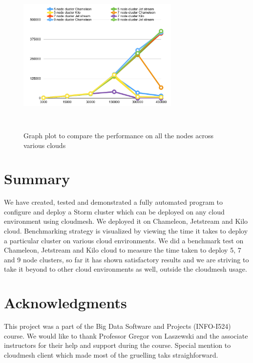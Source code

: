 \documentclass[9pt,twocolumn,twoside]{../../styles/osajnl}
\begin{document}
\begin{figure}[!htb]
  \includegraphics[width=8cm,height=8cm,keepaspectratio,width=\linewidth]{images/bench2-4.PNG}
  \caption{Graph plot to compare the performance on all the nodes across various clouds}
  \label{ac}
\end{figure}

\section{Summary}
We have created, tested and demonstrated a fully automated program to
configure and deploy a Storm cluster which can be deployed on any
cloud environment using cloudmesh. We deployed it on
Chameleon, Jetstream and Kilo cloud. Benchmarking strategy is visualized
by viewing the time it takes to deploy a particular cluster on various
cloud environments. We did a benchmark test on Chameleon, Jetstream
and Kilo cloud to measure the time taken to deploy 5, 7 and 9 node
clusters, so far it has shown satisfactory results and we are striving
to take it beyond to other cloud environments as well, outside the
cloudmesh usage.

\section{Acknowledgments}
This project was a part of the Big Data Software and Projects
(INFO-I524) course. We would like to thank Professor Gregor von
Laszewski and the associate instructors for their help and support
during the course. Special mention to cloudmesh client which made most
of the gruelling taks straighforward.
\end{document}
